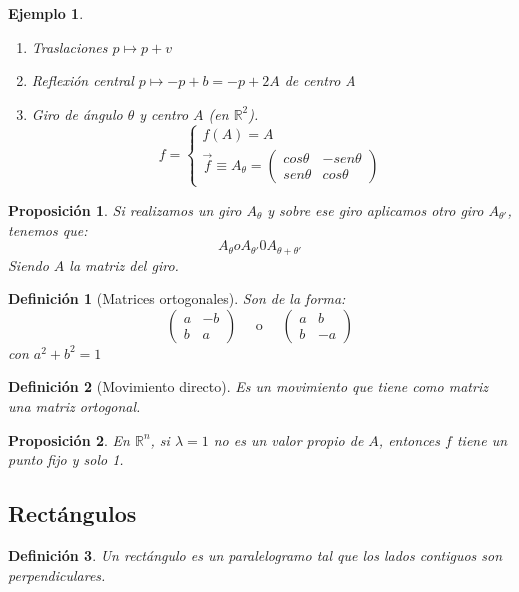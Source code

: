 \documentclass[11pt, a4paper, titlepage]{article}
\newcommand{\R}{\mathbb{R}}
\theoremstyle{theorem-style}
\newtheorem*{nprop}{Proposición}
\theoremstyle{definition-style}
\newtheorem*{ndef}{Definición}
\theoremstyle{remark-style}
\theoremstyle{example-style}
\newtheorem*{ejemplo}{Ejemplo}
\newenvironment{nlist}
{\begin{enumerate}
\renewcommand\labelenumi{(\emph{\roman{enumi})}}}
{\end{enumerate}}
\begin{document}
\begin{ejemplo}
	\begin{nlist}
	\item Traslaciones $p \mapsto p+v$
	\item Reflexión central $p \mapsto -p +b= -p +2A$ de centro A
	\item Giro de ángulo $\theta$ y centro $A$ (en $\R^2$).
	\[
	f= \begin{cases}
	f(A) = A \\
	\vec{f} \equiv A_{\theta} = \begin{pmatrix}
 cos \theta & -sen \theta\\
 sen \theta & cos \theta
\end{pmatrix} 
\end{cases}
	\]
\end{nlist}
\end{ejemplo}

\begin{nprop}
	Si realizamos un giro $A_\theta$ y sobre ese giro aplicamos otro giro $A_{\theta'}$, tenemos que:
	\[
	A_{\theta} o A_{\theta'} 0 A_{\theta+\theta'}
	\]
	Siendo $A$ la matriz del giro.
\end{nprop}

\begin{ndef}[Matrices ortogonales]
	Son de la forma:
	\[
	\begin{pmatrix}
 a & -b \\
 b & a 
\end{pmatrix} \quad \text { o } \quad \begin{pmatrix}
 a & b \\
 b & -a 
\end{pmatrix}
	\]
	con $a^2+b^2 = 1$
\end{ndef}

\begin{ndef}[Movimiento directo]
	Es un movimiento que tiene como matriz una matriz ortogonal. 
\end{ndef}
\begin{nprop}
	En $\R^n$, si $\lambda = 1$ no es un valor propio de $A$, entonces $f$ tiene un punto fijo y solo 1.
\end{nprop}




\subsection{Rectángulos}
\begin{ndef}
	Un rectángulo es un paralelogramo tal que los lados contiguos son perpendiculares.
\end{ndef}
\end{document}
